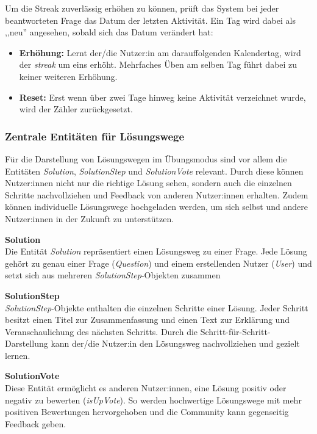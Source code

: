 Um die Streak zuverlässig erhöhen zu können, prüft das System bei jeder beantworteten Frage das Datum der letzten Aktivität. Ein Tag wird dabei als ,,neu'' angesehen, sobald sich das Datum verändert hat:

\begin{itemize}
	\item \textbf{Erhöhung:} Lernt der/die Nutzer:in am darauffolgenden Kalendertag, wird der \textit{streak} um eins erhöht. Mehrfaches Üben am selben Tag führt dabei zu keiner weiteren Erhöhung.
	\item \textbf{Reset:} Erst wenn über zwei Tage hinweg keine Aktivität verzeichnet wurde, wird der Zähler zurückgesetzt.
\end{itemize}


\subsubsection{Zentrale Entitäten für Lösungswege}
Für die Darstellung von Lösungswegen im Übungsmodus sind vor allem die Entitäten \textit{Solution}, \textit{SolutionStep} und 
\textit{SolutionVote} relevant. Durch diese können Nutzer:innen nicht nur die richtige Lösung sehen, sondern auch die einzelnen Schritte 
nachvollziehen und Feedback von anderen Nutzer:innen erhalten. Zudem können individuelle Lösungswege hochgeladen werden, um 
sich selbst und andere Nutzer:innen in der Zukunft zu unterstützen.

\vspace{0.2cm}
\textbf{Solution} \\
Die Entität \textit{Solution} repräsentiert einen Lösungsweg zu einer Frage. Jede Lösung gehört zu genau einer Frage (\textit{Question}) 
und einem erstellenden Nutzer (\textit{User}) und setzt sich aus mehreren \textit{SolutionStep}-Objekten zusammen

\vspace{0.2cm}
\textbf{SolutionStep} \\
\textit{SolutionStep}-Objekte enthalten die einzelnen Schritte einer Lösung. Jeder Schritt besitzt einen Titel zur Zusammenfassung und 
einen Text zur Erklärung und Veranschaulichung des nächsten Schritts. Durch die Schritt-für-Schritt-Darstellung kann der/die Nutzer:in 
den Lösungsweg nachvollziehen und gezielt lernen.

\vspace{0.2cm}
\textbf{SolutionVote} \\
Diese Entität ermöglicht es anderen Nutzer:innen, eine Lösung positiv oder negativ zu bewerten (\textit{isUpVote}). So werden 
hochwertige Lösungswege mit mehr positiven Bewertungen hervorgehoben und die Community kann gegenseitig Feedback geben. 


